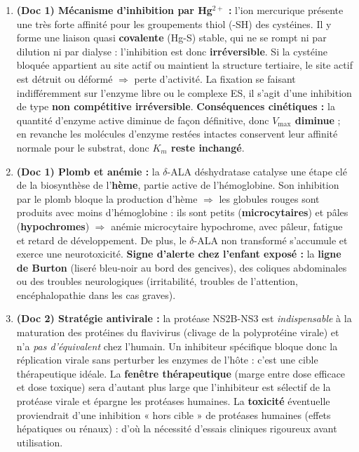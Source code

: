 \documentclass[11pt]{article}
\begin{document}
\begin{corrige}
\begin{enumerate}
    \item \textbf{(Doc 1) Mécanisme d'inhibition par Hg$^{2+}$ :} l'ion mercurique présente une très forte affinité pour les groupements thiol (-SH) des cystéines. Il y forme une liaison quasi \textbf{covalente} (Hg-S) stable, qui ne se rompt ni par dilution ni par dialyse : l'inhibition est donc \textbf{irréversible}. Si la cystéine bloquée appartient au site actif ou maintient la structure tertiaire, le site actif est détruit ou déformé $\Rightarrow$ perte d'activité. La fixation se faisant indifféremment sur l'enzyme libre ou le complexe ES, il s'agit d'une inhibition de type \textbf{non compétitive irréversible}. \textbf{Conséquences cinétiques :} la quantité d'enzyme active diminue de façon définitive, donc \textbf{$V_{\text{max}}$ diminue} ; en revanche les molécules d'enzyme restées intactes conservent leur affinité normale pour le substrat, donc \textbf{$K_m$ reste inchangé}.
    \item \textbf{(Doc 1) Plomb et anémie :} la $\delta$-ALA déshydratase catalyse une étape clé de la biosynthèse de l'\textbf{hème}, partie active de l'hémoglobine. Son inhibition par le plomb bloque la production d'hème $\Rightarrow$ les globules rouges sont produits avec moins d'hémoglobine : ils sont petits (\textbf{microcytaires}) et pâles (\textbf{hypochromes}) $\Rightarrow$ anémie microcytaire hypochrome, avec pâleur, fatigue et retard de développement. De plus, le $\delta$-ALA non transformé s'accumule et exerce une neurotoxicité. \textbf{Signe d'alerte chez l'enfant exposé :} la \textbf{ligne de Burton} (liseré bleu-noir au bord des gencives), des coliques abdominales ou des troubles neurologiques (irritabilité, troubles de l'attention, encéphalopathie dans les cas graves).
    \item \textbf{(Doc 2) Stratégie antivirale :} la protéase NS2B-NS3 est \emph{indispensable} à la maturation des protéines du flavivirus (clivage de la polyprotéine virale) et n'a \emph{pas d'équivalent} chez l'humain. Un inhibiteur spécifique bloque donc la réplication virale sans perturber les enzymes de l'hôte : c'est une cible thérapeutique idéale. La \textbf{fenêtre thérapeutique} (marge entre dose efficace et dose toxique) sera d'autant plus large que l'inhibiteur est sélectif de la protéase virale et épargne les protéases humaines. La \textbf{toxicité} éventuelle proviendrait d'une inhibition « hors cible » de protéases humaines (effets hépatiques ou rénaux) : d'où la nécessité d'essais cliniques rigoureux avant utilisation.

\end{enumerate}
\end{corrige}
\end{document}

